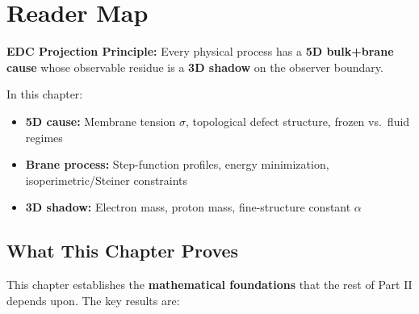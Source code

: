 
\section{Reader Map}
\label{sec:ch2_reader_map}

\begin{tcolorbox}[colback=blue!3!white, colframe=blue!50!black,
    title=\textbf{Framework 2.0 Reminder}]
\textbf{EDC Projection Principle:} Every physical process has a \textbf{5D bulk+brane cause}
whose observable residue is a \textbf{3D shadow} on the observer boundary.

In this chapter:
\begin{itemize}[nosep]
    \item \textbf{5D cause:} Membrane tension $\sigma$, topological defect structure, frozen vs.\ fluid regimes
    \item \textbf{Brane process:} Step-function profiles, energy minimization, isoperimetric/Steiner constraints
    \item \textbf{3D shadow:} Electron mass, proton mass, fine-structure constant $\alpha$
\end{itemize}
\end{tcolorbox}

\subsection{What This Chapter Proves}

This chapter establishes the \textbf{mathematical foundations} that the rest of Part II depends upon.
The key results are:

